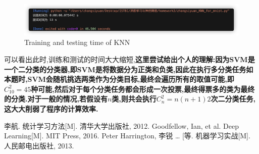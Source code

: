 \documentclass[UTF8,a4paper,11pt]{ctexart}
\begin{document}
\begin{figure}[H]
	\centering
	\includegraphics[width=1.0\textwidth,height=0.2\textwidth]{time_knn.png}
	\caption{Training and testing time of KNN}
\end{figure}
\par 可以看出此时,训练和测试的时间大大缩短,\textbf{这里尝试给出个人的理解:因为SVM是一个二分类的分类器,即SVM是将数据分为正类和负类,因此在执行多分类任务如本题时,SVM会随机挑选两类作为分类目标,最终会遍历所有的取值可能,即$C_{10}^{2}=45$种可能,然后对于每个分类任务都会形成一次投票,最终得票多的类为最终的分类.对于一般的情况,若假设有$n$类,则共会执行$C_{n}^{2}={n(n+1)}{2}$次二分类任务,这大大削弱了程序的计算效率.}
\newpage
\begin{thebibliography}{3}  
	 李航. 统计学习方法[M]. 清华大学出版社, 2012.
	 Goodfellow, Ian, et al. Deep Learning[M]. MIT Press, 2016. 	
	 Peter Harrington, 李锐 … [等. 机器学习实战[M]. 人民邮电出版社, 2013.
\end{thebibliography}
\end{document}
